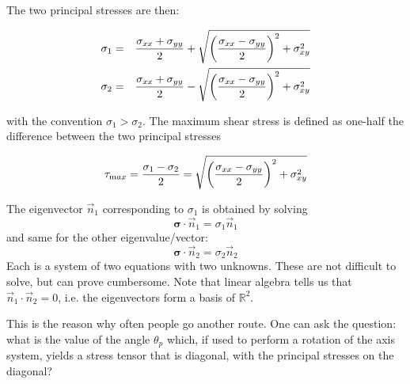 The two principal stresses are then:
\begin{mdframed}[backgroundcolor=blue!5]
\begin{eqnarray}
\sigma_1 &=& \frac{ \sigma_{xx}+\sigma_{yy}}{2} + \sqrt{ \left(\frac{\sigma_{xx}-\sigma_{yy}}{2}\right)^2 +\sigma_{xy}^2 } \nonumber\\
\sigma_2 &=& \frac{ \sigma_{xx}+\sigma_{yy}}{2} - \sqrt{ \left(\frac{\sigma_{xx}-\sigma_{yy}}{2}\right)^2 +\sigma_{xy}^2 } \label{eq:princ_stress_2D} 
\end{eqnarray}
\end{mdframed}
with the convention $\sigma_1>\sigma_2$.
The maximum shear stress is defined as one-half the difference between the two principal 
stresses 
\begin{mdframed}[backgroundcolor=blue!5]
\begin{equation}
\tau_{\text max}=
\frac{\sigma_1-\sigma_2}{2}
=\sqrt{ \left(\frac{\sigma_{xx}-\sigma_{yy}}{2}\right)^2 +\sigma_{xy}^2 }
\label{eq:max_shear_stress_2D} 
\end{equation}
\end{mdframed}
The eigenvector $\vec{n}_1$ corresponding to $\sigma_1$ is obtained by solving 
\[
{\bm \sigma}\!\cdot\! \vec{n}_1 = \sigma_1 \vec{n}_1
\]
and same for the other eigenvalue/vector:
\[
{\bm \sigma} \!\cdot\! \vec{n}_2 = \sigma_2 \vec{n}_2
\]
Each is a system of two equations with two unknowns. These are not difficult to solve, 
but can prove cumbersome. Note that linear algebra tells us that $\vec{n}_1\cdot\vec{n}_2=0$, 
i.e. the eigenvectors form a basis of $\mathbb{R}^2$.

This is the reason why often people go another route. One can ask the question: what is the 
value of the angle $\theta_p$ which, if used to perform a rotation of the axis system, yields 
a stress tensor that is diagonal, with the principal stresses on the diagonal?
 
